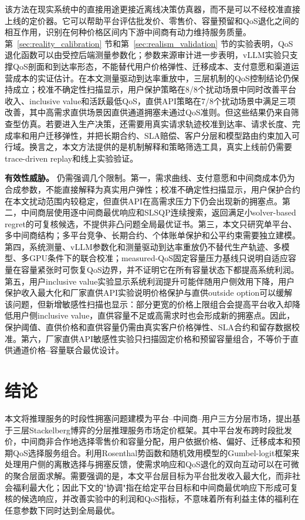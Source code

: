 \documentclass[UTF8,11pt]{ctexart}
\begin{document}
该方法在现实系统中的直接用途更接近离线决策仿真器，而不是可以不经校准直接上线的定价器。它可以帮助平台评估批发价、零售价、容量预留和QoS退化之间的相互作用，识别在何种价格区间内下游中间商有动力维持服务质量。第~\ref{sec:reality_calibration} 节和第~\ref{sec:realism_validation} 节的实验表明，QoS退化函数可以由受控后端测量参数化；参数来源审计进一步表明，vLLM实验只支撑QoS剖面和到达率形态，不能替代用户价格弹性、迁移成本、支付意愿和渠道运营成本的实证估计。在本文测量驱动到达率重放中，三层机制的QoS控制结论仍保持成立；校准不确定性扫描显示，用户保护策略在8/8个扰动场景中同时改善平台收入、inclusive value和活跃最低QoS，直供API策略在7/8个扰动场景中满足三项改善，其中高需求直供场景因直供通道拥塞未通过QoS准则。但这些结果仍来自筛查型仿真。若要进入生产决策，还需要用真实请求轨迹校准到达率、请求长度、完成率和用户迁移弹性，并把长期合约、SLA赔偿、客户分层和模型路由约束加入可行域。换言之，本文方法提供的是机制解释和策略筛选工具，真实上线前仍需要trace-driven replay和线上实验验证。

\textbf{有效性威胁。} 仍需强调几个限制。第一，需求曲线、支付意愿和中间商成本仍为合成参数，不能直接解释为真实用户弹性；校准不确定性扫描显示，用户保护合约在本文扰动范围内较稳定，但直供API在高需求压力下仍会出现新的拥塞点。第二，中间商层使用逐中间商最优响应和SLSQP连续搜索，返回满足小solver-based regret的可复核候选，不提供非凸问题全局最优证书。第三，本文只研究单平台、多中间商结构；多平台竞争、长期合约、个体账单保护和公平约束需要独立建模。第四，系统测量、vLLM参数化和测量驱动到达率重放仍不替代生产轨迹、多模型、多GPU条件下的联合校准；measured-QoS固定容量压力基线只说明自适应容量在容量紧张时可恢复QoS边界，并不证明它在所有容量状态下都提高系统利润。第五，用户inclusive value实验显示系统利润提升可能伴随用户侧效用下降，用户保护收入最大化和厂家直供API实验说明价格保护与直供outside option可以缓解该问题，但新增敏感性扫描也显示：部分更宽的价格上限组合会提高平台收入却降低用户侧inclusive value，直供容量不足或高需求时也会形成新的拥塞点。因此，保护阈值、直供价格和直供容量仍需由真实客户价格弹性、SLA合约和留存数据校准。第六，厂家直供API敏感性实验只扫描固定价格和预留容量组合，不等价于直供通道价格--容量联合最优设计。

\section{结论}
\label{sec:conclusion}

本文将推理服务的时段性拥塞问题建模为平台--中间商--用户三方分层市场，提出基于三层Stackelberg博弈的分层推理服务市场定价框架。其中平台发布跨时段批发价，中间商非合作地选择零售价和容量分配，用户依据价格、偏好、迁移成本和预期QoS选择服务组合。利用Rosenthal势函数和随机效用模型的Gumbel-logit框架来处理用户侧的离散选择与拥塞反馈，使需求响应和QoS退化的双向互动可以在可微的聚合层面求解。需要强调的是，本文平台层目标为平台批发收入最大化，而非社会福利最大化；因此下文的"协调"指在给定平台目标和中间商最优响应下形成可复核的候选响应，并改善实验中的利润和QoS指标，不意味着所有利益主体的福利在任意参数下同时达到全局最优。
\end{document}
